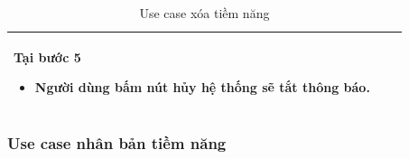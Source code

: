 \documentclass[12pt,a4paper]{article}
\begin{document}
\begin{table}[H]
\begin{tabular}{|p{3.5cm}|p{11.5cm}|c|}
            Tại bước 5\newline
            \vspace{-.8cm}\begin{itemize}
                              \item Người dùng bấm nút hủy hệ thống sẽ tắt thông báo.
            \end{itemize} \\
            \hline
        \end{tabular}
        \caption{Use case xóa tiềm năng }
    \end{table}

    \subsubsection*{Use case nhân bản tiềm năng }
\end{document}
